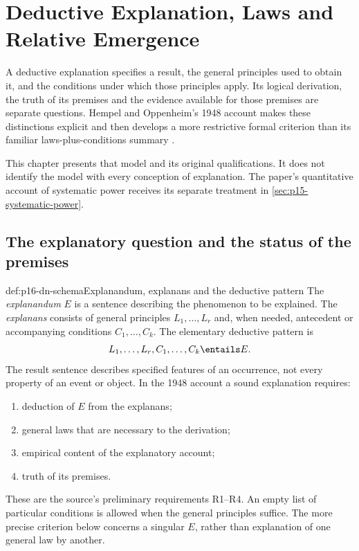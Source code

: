 \chapter{Deductive Explanation, Laws and Relative Emergence}
\label{sec:p16-deductive-nomological-explanation}

A deductive explanation specifies a result, the general principles
used to obtain it, and the conditions under which those principles
apply. Its logical derivation, the truth of its premises and the
evidence available for those premises are separate questions.
Hempel and Oppenheim's 1948 account makes these distinctions
explicit and then develops a more restrictive formal criterion
than its familiar laws-plus-conditions summary
\cite[parts~I--III, pp.~135--164]{HempelOppenheim1948Explanation}.

This chapter presents that model and its original qualifications.
It does not identify the model with every conception of explanation.
The paper's quantitative account of systematic power receives
its separate treatment in \cref{sec:p15-systematic-power}.

\section{The explanatory question and the status of the premises}
\label{sec:p16-dn-question}

\begin{hbdefinition}{def:p16-dn-schema}{Explanandum, explanans and the deductive pattern}
The \emph{explanandum} \(E\) is a sentence describing the
phenomenon to be explained. The \emph{explanans} consists
of general principles \(L_1,\ldots,L_r\) and, when needed,
antecedent or accompanying conditions \(C_1,\ldots,C_k\).
The elementary deductive pattern is
\[
             L_1,\ldots,L_r,C_1,\ldots,C_k\entails E .
\]
The result sentence describes specified features of an occurrence,
not every property of an event or object.
In the 1948 account a sound explanation requires:
\begin{enumerate}
\item deduction of \(E\) from the explanans;
\item general laws that are necessary to the derivation;
\item empirical content of the explanatory account;
\item truth of its premises.
\end{enumerate}
These are the source's preliminary requirements R1--R4.
An empty list of particular conditions is allowed when the
general principles suffice. The more precise criterion below
concerns a singular \(E\), rather than explanation of one
general law by another.
\end{hbdefinition}

